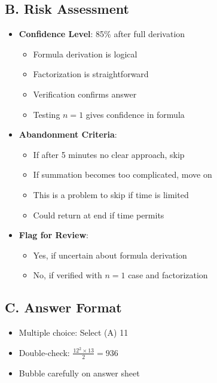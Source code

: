 \documentclass[12pt]{article}
\begin{document}
\begin{competitionbox}
\subsection*{B. Risk Assessment}
\begin{itemize}[leftmargin=*]
    \item \textbf{Confidence Level}: 85\% after full derivation
    \begin{itemize}
        \item Formula derivation is logical
        \item Factorization is straightforward
        \item Verification confirms answer
        \item Testing $n=1$ gives confidence in formula
    \end{itemize}
    \item \textbf{Abandonment Criteria}: 
    \begin{itemize}
        \item If after 5 minutes no clear approach, skip
        \item If summation becomes too complicated, move on
        \item This is a problem to skip if time is limited
        \item Could return at end if time permits
    \end{itemize}
    \item \textbf{Flag for Review}: 
    \begin{itemize}
        \item Yes, if uncertain about formula derivation
        \item No, if verified with $n=1$ case and factorization
    \end{itemize}
\end{itemize}

\subsection*{C. Answer Format}
\begin{itemize}[leftmargin=*]
    \item Multiple choice: Select (A) 11
    \item Double-check: $\frac{12^2 \times 13}{2} = 936$ \checkmark
    \item Bubble carefully on answer sheet
\end{itemize}
\end{competitionbox}
\end{document}
